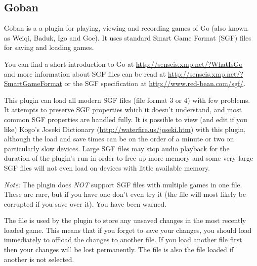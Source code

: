 \subsection{Goban}
Goban is a a plugin for playing, viewing and recording games of Go (also known
as Weiqi, Baduk, Igo and Goe).  It uses standard Smart Game Format (SGF) files
for saving and loading games.

You can find a short introduction to Go at
\url{http://senseis.xmp.net/?WhatIsGo} and more information about SGF files
can be read at \url{http://senseis.xmp.net/?SmartGameFormat} or the SGF
specification at
\url{http://www.red-bean.com/sgf/}.

This plugin can load all modern SGF files (file format 3 or 4) with few problems.
It attempts to preserve SGF properties which it doesn't understand, and most common
SGF properties are handled fully.  It is possible to view (and edit if you like)
Kogo's Joseki Dictionary (\url{http://waterfire.us/joseki.htm}) with this plugin,
although the load and save times can be on the order of a minute or two on
particularly slow devices.  Large SGF files may stop audio playback for the duration
of the plugin's run in order to free up more memory and some very large SGF files will
not even load on devices with little available memory.

\emph{Note: } The plugin does \emph{NOT} support SGF files with multiple games in
one file.  These are rare, but if you have one don't even try it (the file will most
likely be corrupted if you save over it).  You have been warned.

The file  is used by the plugin to store any unsaved
changes in the most recently loaded game.  This means that if you forget to save your
changes, you should load  immediately to offload the changes
to another file.  If you load another file first then your changes will be lost
permanently.  The  file is also the file loaded if another
is not selected.

